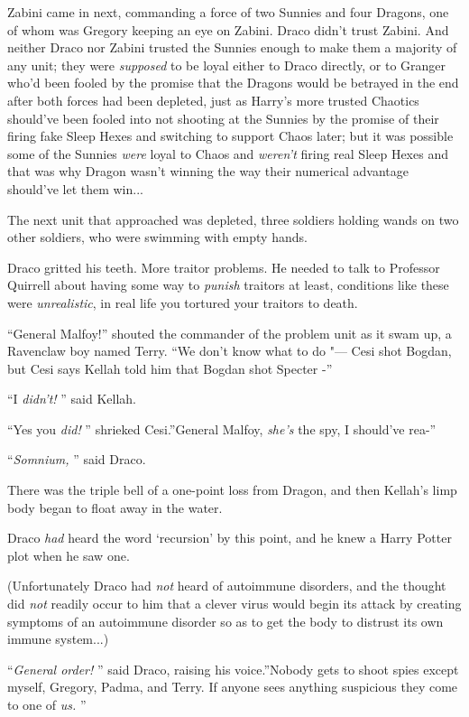 Zabini came in next, commanding a force of two Sunnies and four Dragons,
one of whom was Gregory keeping an eye on Zabini. Draco didn't trust
Zabini. And neither Draco nor Zabini trusted the Sunnies enough to make
them a majority of any unit; they were \emph{supposed} to be loyal
either to Draco directly, or to Granger who'd been fooled by the promise
that the Dragons would be betrayed in the end after both forces had been
depleted, just as Harry's more trusted Chaotics should've been fooled
into not shooting at the Sunnies by the promise of their firing fake
Sleep Hexes and switching to support Chaos later; but it was possible
some of the Sunnies \emph{were} loyal to Chaos and \emph{weren't} firing
real Sleep Hexes and that was why Dragon wasn't winning the way their
numerical advantage should've let them win...

The next unit that approached was depleted, three soldiers holding wands
on two other soldiers, who were swimming with empty hands.

Draco gritted his teeth. More traitor problems. He needed to talk to
Professor Quirrell about having some way to \emph{punish} traitors at
least, conditions like these were \emph{unrealistic}, in real life you
tortured your traitors to death.

``General Malfoy!'' shouted the commander of the problem unit as it swam
up, a Ravenclaw boy named Terry. ``We don't know what to do "--- Cesi shot
Bogdan, but Cesi says Kellah told him that Bogdan shot Specter -''

``I \emph{didn't!} '' said Kellah.

``Yes you \emph{did!} '' shrieked Cesi.''General Malfoy, \emph{she's} the
spy, I should've rea-''

``\emph{Somnium,} '' said Draco.

There was the triple bell of a one-point loss from Dragon, and then
Kellah's limp body began to float away in the water.

Draco \emph{had} heard the word `recursion' by this point, and he knew a
Harry Potter plot when he saw one.

(Unfortunately Draco had \emph{not} heard of autoimmune disorders, and
the thought did \emph{not} readily occur to him that a clever virus
would begin its attack by creating symptoms of an autoimmune disorder so
as to get the body to distrust its own immune system...)

``\emph{General order!} '' said Draco, raising his voice.''Nobody gets to
shoot spies except myself, Gregory, Padma, and Terry. If anyone sees
anything suspicious they come to one of \emph{us.} ''

